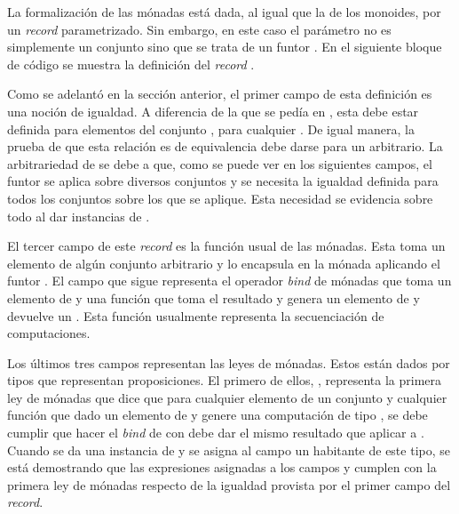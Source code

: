 La formalización de las mónadas está dada, al igual que la de los monoides, por un \textit{record} parametrizado. Sin embargo, en este caso el parámetro no es simplemente un conjunto sino que se trata de un funtor  \AgdaSymbol{:}  \AgdaSymbol{$\rightarrow$} . En el siguiente bloque de código se muestra la definición del \textit{record} . 


Como se adelantó en la sección anterior, el primer campo de esta definición es una noción de igualdad. A diferencia de la que se pedía en , esta debe estar definida para elementos del conjunto , para cualquier . De igual manera, la prueba de que esta relación es de equivalencia debe darse para un  arbitrario. La arbitrariedad de  se debe a que, como se puede ver en los siguientes campos, el funtor  se aplica sobre diversos conjuntos y se necesita la igualdad definida para todos los conjuntos sobre los que  se aplique. Esta necesidad se evidencia sobre todo al dar instancias de .

El tercer campo de este \textit{record} es la función  usual de las mónadas. Esta toma un elemento de algún conjunto  arbitrario y lo encapsula en la mónada aplicando el funtor . El campo que sigue representa el operador \textit{bind} de mónadas que toma un elemento de  y una función que toma el resultado  y genera un elemento de  y devuelve un . Esta función usualmente representa la secuenciación de computaciones. 

Los últimos tres campos representan las leyes de mónadas. Estos están dados por tipos que representan proposiciones. El primero de ellos, , representa la primera ley de mónadas que dice que para cualquier elemento  de un conjunto  y cualquier función  que dado un elemento de  y genere una computación de tipo , se debe cumplir que hacer el \textit{bind} de   con  debe dar el mismo resultado que aplicar  a . Cuando se da una instancia de  y se asigna al campo  un habitante de este tipo, se está demostrando que las expresiones asignadas a los campos  y \AgdaField{$\_\gg=\_$} cumplen con la primera ley de mónadas respecto de la igualdad provista por el primer campo del \textit{record}.


